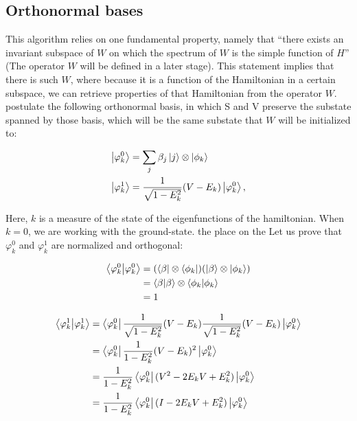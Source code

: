 \subsection{Orthonormal bases}
This algorithm relies on one fundamental property, namely that ``there exists an invariant subspace of $W$ on which the spectrum of $W$ is the simple function of $H$'' (The operator $W$ will be defined in a later stage). This statement implies that there is such $W$, where because it is a function of the Hamiltonian in a certain subspace, we can retrieve properties of that Hamiltonian from the operator $W$. \textcite{poulin} postulate the following orthonormal basis, in which S and V preserve the substate spanned by those basis, which will be the same substate that $W$ will be initialized to:

\begin{align} \begin{split}
\left\vert{\varphi_k^0}\right\rangle &= \sum_j\beta_j\left\vert{j}\right\rangle\otimes\left\vert{\phi_k}\right\rangle \\
\left\vert{\varphi_k^1}\right\rangle &= \frac 1{\sqrt{1-E_k^2}}(V-E_k)\left\vert{\varphi_k^0}\right\rangle,
\end{split} \end{align}

Here, $k$ is a measure of the state of the eigenfunctions of the hamiltonian. When $k=0$, we are working with the ground-state. the place on the  Let us prove that $\varphi_k^0$ and $\varphi_k^1$ are normalized and orthogonal:

\begin{align} \begin{split}
\braket{\varphi_k^0}{\varphi_k^0}  &= (\left\langle{\beta}\right\vert \otimes \left\langle{\phi_k}\right\vert)(\left\vert{\beta}\right\rangle \otimes \left\vert{\phi_k}\right\rangle)\\
&= \braket{\beta}{\beta} \otimes \braket{\phi_k}{\phi_k}\\
&= 1
\end{split} \end{align}

\begin{align} \begin{split}
\braket{\varphi_k^1}{\varphi_k^1}  &= \left\langle{\varphi_k^0}\right\vert \frac{1}{\sqrt{1 - E^2_k}}(V-E_k) \frac{1}{\sqrt{1 - E^2_k}}(V-E_k) \left\vert{\varphi_k^0}\right\rangle\\
&= \left\langle{\varphi_k^0}\right\vert \frac{1}{1 - E^2_k} (V-E_k)^2  \left\vert{\varphi_k^0}\right\rangle\\
&= \frac{1}{1 - E^2_k} \left\langle{\varphi_k^0}\right\vert (V^2 - 2 E_kV + E_k^2) \left\vert{\varphi_k^0}\right\rangle\\
&= \frac{1}{1 - E^2_k} \left\langle{\varphi_k^0}\right\vert (I - 2 E_kV + E_k^2) \left\vert{\varphi_k^0}\right\rangle\\
\end{split} \end{align}


